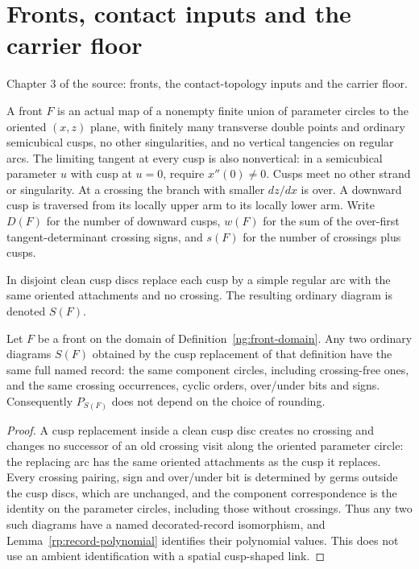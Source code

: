 \chapter{Fronts, contact inputs and the carrier floor}
Chapter 3 of the source: fronts, the contact-topology inputs and the carrier floor.

\begin{definition}\label{ng:front-domain}\leanok
A front $F$ is an actual map of a nonempty finite union of parameter
circles to the oriented $(x,z)$ plane, with finitely many transverse
double points and ordinary semicubical cusps, no other singularities,
and no vertical tangencies on regular arcs. The limiting tangent at every
cusp is also nonvertical: in a semicubical parameter $u$ with cusp at
$u=0$, require $x''(0)\ne0$. Cusps meet no other strand or singularity.
At a crossing the branch with smaller $dz/dx$ is over. A downward cusp is
traversed from its locally upper arm to its locally lower arm. Write
$D(F)$ for the number of downward cusps, $w(F)$ for the sum of the
over-first tangent-determinant crossing signs, and $s(F)$ for the number
of crossings plus cusps.

In disjoint clean cusp discs replace each cusp by a simple regular arc
with the same oriented attachments and no crossing. The resulting
ordinary diagram is denoted $S(F)$.
\end{definition}

\begin{lemma}\label{ng:smoothing-record}\leanok
Let $F$ be a front on the domain of Definition~\ref{ng:front-domain}. Any two
ordinary diagrams $S(F)$ obtained by the cusp replacement of that definition
have the same full named record: the same component circles, including
crossing-free ones, and the same crossing occurrences, cyclic orders,
over/under bits and signs. Consequently $P_{S(F)}$ does not depend on the
choice of rounding.

\end{lemma}
\begin{proof}\leanok{}
A cusp replacement inside a clean cusp disc creates no crossing and changes
no successor of an old crossing visit along the oriented parameter circle:
the replacing arc has the same oriented attachments as the cusp it replaces.
Every crossing pairing, sign and over/under bit is determined by germs
outside the cusp discs, which are unchanged, and the component
correspondence is the identity on the parameter circles, including those
without crossings. Thus any two such diagrams have a named decorated-record
isomorphism, and Lemma~\ref{rp:record-polynomial} identifies their
polynomial values. This does not use an ambient identification with a
spatial cusp-shaped link.
\end{proof}

